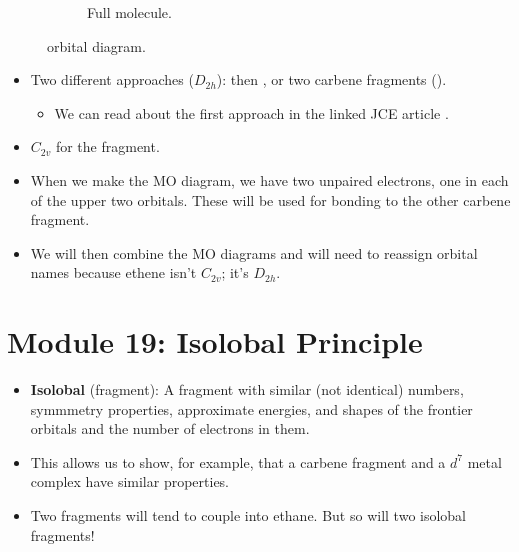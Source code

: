 \documentclass[../notes.tex]{subfiles}
\begin{document}
\begin{itemize}
\begin{figure}[h!]
\begin{subfigure}[b]{0.49\linewidth}
            \caption{Full molecule.}
            \label{fig:orbitalDiagram-C2H4b}
        \end{subfigure}
        \caption{ orbital diagram.}
        \label{fig:orbitalDiagram-C2H4}
    \end{figure}
    \begin{itemize}
        \item Two different approaches ($D_{2h}$):  then , or two carbene fragments ().
        \begin{itemize}
            \item We can read about the first approach in the linked JCE article \parencite{bib:reinforceMOTheory}.
        \end{itemize}
        \item $C_{2v}$ for the  fragment.
        \item When we make the MO diagram, we have two unpaired electrons, one in each of the upper two orbitals. These will be used for bonding to the other carbene fragment.
        \item We will then combine the MO diagrams and will need to reassign orbital names because ethene isn't $C_{2v}$; it's $D_{2h}$.
    \end{itemize}
\end{itemize}



\section{Module 19: Isolobal Principle}
\begin{itemize}
    \item \textbf{Isolobal} (fragment): A fragment with similar (not identical) numbers, symmmetry properties, approximate energies, and shapes of the frontier orbitals and the number of electrons in them.
    \item This allows us to show, for example, that a carbene fragment and a $d^7$ metal complex have similar properties.
    \item Two  fragments will tend to couple into ethane. But so will two isolobal  fragments!
\end{itemize}
\end{document}
